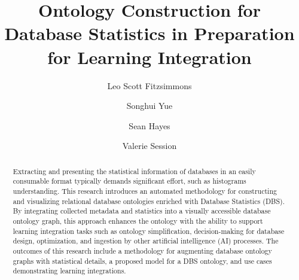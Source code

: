 \documentclass[sigconf]{acmart}
\begin{document}
\title{Ontology Construction for Database Statistics in Preparation for Learning Integration}

\author{Leo Scott Fitzsimmons}

\author{Songhui Yue}

\author{Sean Hayes}
	
\author{Valerie Session}


\renewcommand{\shortauthors}{Trovato et al.}

\begin{abstract}
Extracting and presenting the statistical information of databases in an easily consumable format typically demands significant effort, such as histograms understanding. This research introduces an automated methodology for constructing and visualizing relational database ontologies enriched with Database Statistics (DBS). By integrating collected metadata and statistics into a visually accessible database ontology graph, this approach enhances the ontology with the ability to support learning integration tasks such as ontology simplification, decision-making for database design, optimization, and ingestion by other artificial intelligence (AI) processes. The outcomes of this research include a methodology for augmenting database ontology graphs with statistical details, a proposed model for a DBS ontology, and use cases demonstrating learning integrations.
\end{abstract}
\end{document}
